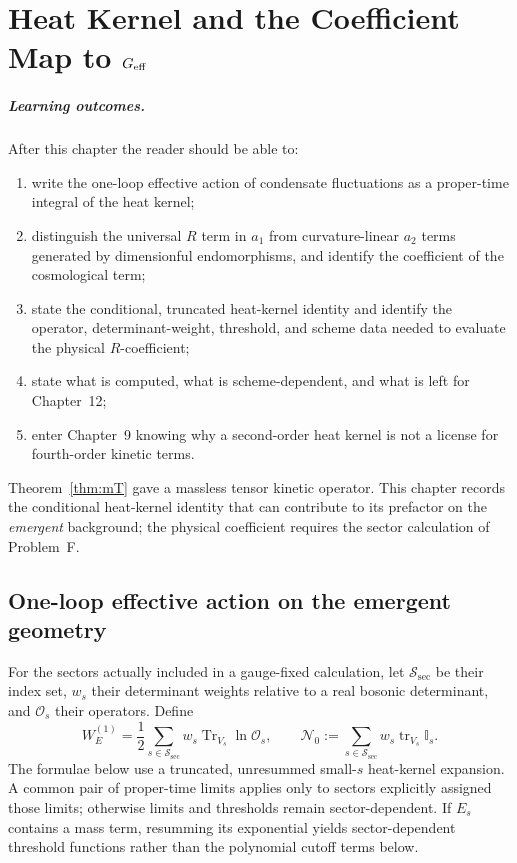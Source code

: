 \chapter[Heat kernel and $\Geff$]{Heat Kernel and the Coefficient Map to \(\Geff\)}
\label{ch:heat-kernel}

\paragraph{Learning outcomes.}
After this chapter the reader should be able to:
\begin{enumerate}
  \item write the one-loop effective action of condensate
        fluctuations as a proper-time integral of the heat kernel;
  \item distinguish the universal \(R\) term in \(a_1\) from
        curvature-linear \(a_2\) terms generated by dimensionful
        endomorphisms, and identify the coefficient of the
        cosmological term;
  \item state the conditional, truncated heat-kernel identity and
        identify the operator, determinant-weight, threshold, and
        scheme data needed to evaluate the physical \(R\)-coefficient;
  \item state what is computed, what is scheme-dependent, and what
        is left for Chapter~12;
  \item enter Chapter~9 knowing why a second-order heat kernel is
        not a license for fourth-order kinetic terms.
\end{enumerate}

Theorem~\ref{thm:mT} gave a massless tensor kinetic operator. This
chapter records the conditional heat-kernel identity that can
contribute to its prefactor on the \emph{emergent} background; the
physical coefficient requires the sector calculation of Problem~F.

\section{One-loop effective action on the emergent geometry}
\label{sec:ch8-W}

For the sectors actually included in a gauge-fixed calculation, let
\(\mathcal{S}_{\mathrm{sec}}\) be their index set, \(w_s\) their determinant weights
relative to a real bosonic determinant, and \(\mathcal O_s\) their
operators. Define
\begin{equation}
  \label{eq:ch8-sector-sum}
  W_E^{(1)}
  =\frac12\sum_{s\in\mathcal{S}_{\mathrm{sec}}}w_s
      \operatorname{Tr}_{V_s}\ln\mathcal O_s,
  \qquad
  \mathcal N_0
  :=\sum_{s\in\mathcal{S}_{\mathrm{sec}}}w_s
      \operatorname{tr}_{V_s}\mathbb I_s .
\end{equation}
The formulae below use a truncated, unresummed small-\(s\)
heat-kernel expansion. A common pair of proper-time limits applies
only to sectors explicitly assigned those limits; otherwise limits
and thresholds remain sector-dependent. If \(E_s\) contains a mass
term, resumming its exponential yields sector-dependent threshold
functions rather than the polynomial cutoff terms below.

